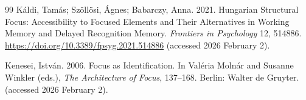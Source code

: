 \documentclass[a4paper, ruler]{CUP-JNL-LIN}%
\begin{document}
\begin{Backmatter}
\begin{thebibliography}{99}
{Káldi, Tamás; Szöllösi, Ágnes; Babarczy, Anna}. 2021. Hungarian Structural Focus: Accessibility to Focused Elements and Their Alternatives in Working Memory and Delayed Recognition Memory. \textit{Frontiers in Psychology} 12, 514886. \url{https://doi.org/10.3389/fpsyg.2021.514886}  (accessed 2026 February 2).




{Kenesei, István}. 2006. Focus as Identification. In Valéria Molnár and Susanne Winkler (eds.), \textit{The Architecture of Focus}, 137--168. Berlin: Walter de Gruyter. (accessed 2026 February 2).




\end{thebibliography}
\end{Backmatter}
\end{document}

